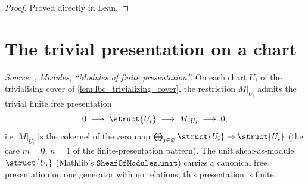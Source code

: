 \begin{proof}

\leanok
  Proved directly in Lean.
\end{proof}

\section{The trivial presentation on a chart}
\label{sec:lbc_chart_presentation}

\begin{lemma}\leanok
  \label{lem:lbc_chart_presentation}
  \textit{Source: \cite{stacks-project}, Modules, ``Modules of finite
  presentation''.}
  On each chart \(U_i\) of the trivialising cover of
  \cref{lem:lbc_trivializing_cover}, the restriction \(M|_{U_i}\) admits the
  trivial finite free presentation
  \[
    0 \;\longrightarrow\; \struct{U_i} \;\longrightarrow\; M|_{U_i}
    \;\longrightarrow\; 0,
  \]
  i.e. \(M|_{U_i}\) is the cokernel of the zero map
  \(\bigoplus_{j \in \varnothing} \struct{U_i} \to \struct{U_i}\)
  (the case \(m = 0\), \(n = 1\) of the finite-presentation pattern). The
  unit sheaf-as-module \(\struct{U_i}\) (Mathlib's \(\mathtt{SheafOfModules.unit}\))
  carries a canonical free presentation on one generator with no relations;
  this presentation is finite.
\end{lemma}

